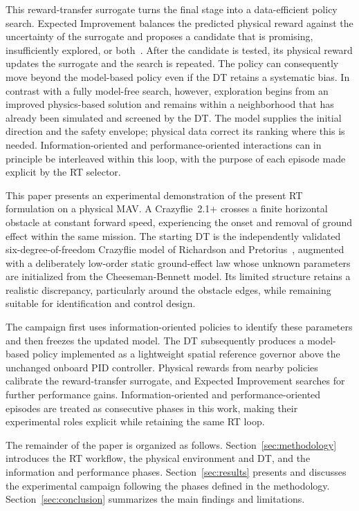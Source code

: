 \documentclass[journal]{IEEEtran}
\begin{document}
This reward-transfer surrogate turns the final stage into a data-efficient policy search. Expected Improvement balances the predicted physical reward against the uncertainty of the surrogate and proposes a candidate that is promising, insufficiently explored, or both~\cite{Mockus1975,Forrester2007}. After the candidate is tested, its physical reward updates the surrogate and the search is repeated. The policy can consequently move beyond the model-based policy even if the DT retains a systematic bias. In contrast with a fully model-free search, however, exploration begins from an improved physics-based solution and remains within a neighborhood that has already been simulated and screened by the DT. The model supplies the initial direction and the safety envelope; physical data correct its ranking where this is needed. Information-oriented and performance-oriented interactions can in principle be interleaved within this loop, with the purpose of each episode made explicit by the RT selector.

This paper presents an experimental demonstration of the present RT formulation on a physical MAV. A Crazyflie~2.1+ crosses a finite horizontal obstacle at constant forward speed, experiencing the onset and removal of ground effect within the same mission. The starting DT is the independently validated six-degree-of-freedom Crazyflie model of Richardson and Pretorius~\cite{Richardson2025}, augmented with a deliberately low-order static ground-effect law whose unknown parameters are initialized from the Cheeseman-Bennett model. Its limited structure retains a realistic discrepancy, particularly around the obstacle edges, while remaining suitable for identification and control design.

The campaign first uses information-oriented policies to identify these parameters and then freezes the updated model. The DT subsequently produces a model-based policy implemented as a lightweight spatial reference governor above the unchanged onboard PID controller. Physical rewards from nearby policies calibrate the reward-transfer surrogate, and Expected Improvement searches for further performance gains. Information-oriented and performance-oriented episodes are treated as consecutive phases in this work, making their experimental roles explicit while retaining the same RT loop.

The remainder of the paper is organized as follows. Section~\ref{sec:methodology} introduces the RT workflow, the physical environment and DT, and the information and performance phases. Section~\ref{sec:results} presents and discusses the experimental campaign following the phases defined in the methodology. Section~\ref{sec:conclusion} summarizes the main findings and limitations.
\end{document}

